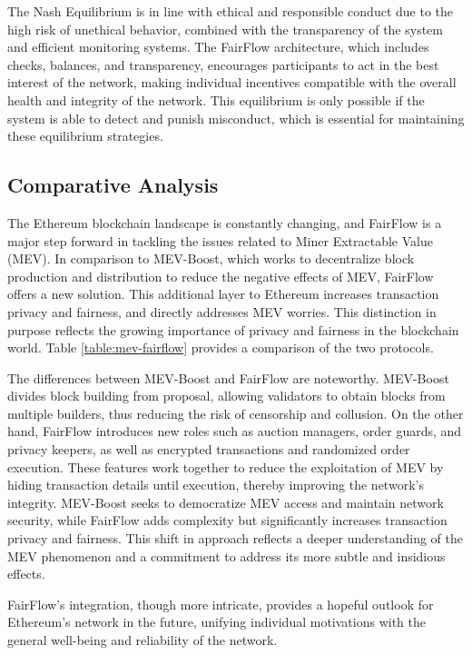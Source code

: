 \documentclass{article}
\begin{document}
The Nash Equilibrium is in line with ethical and responsible conduct due to the high risk of unethical behavior, combined with the transparency of the system and efficient monitoring systems. The FairFlow architecture, which includes checks, balances, and transparency, encourages participants to act in the best interest of the network, making individual incentives compatible with the overall health and integrity of the network. This equilibrium is only possible if the system is able to detect and punish misconduct, which is essential for maintaining these equilibrium strategies.

\subsection{Comparative Analysis}

The Ethereum blockchain landscape is constantly changing, and FairFlow is a major step forward in tackling the issues related to Miner Extractable Value (MEV). In comparison to MEV-Boost, which works to decentralize block production and distribution to reduce the negative effects of MEV, FairFlow offers a new solution. This additional layer to Ethereum increases transaction privacy and fairness, and directly addresses MEV worries. This distinction in purpose reflects the growing importance of privacy and fairness in the blockchain world. Table \ref{table:mev-fairflow} provides a comparison of the two protocols.

The differences between MEV-Boost and FairFlow are noteworthy. MEV-Boost divides block building from proposal, allowing validators to obtain blocks from multiple builders, thus reducing the risk of censorship and collusion. On the other hand, FairFlow introduces new roles such as auction managers, order guards, and privacy keepers, as well as encrypted transactions and randomized order execution. These features work together to reduce the exploitation of MEV by hiding transaction details until execution, thereby improving the network's integrity. MEV-Boost seeks to democratize MEV access and maintain network security, while FairFlow adds complexity but significantly increases transaction privacy and fairness. This shift in approach reflects a deeper understanding of the MEV phenomenon and a commitment to address its more subtle and insidious effects.

FairFlow's integration, though more intricate, provides a hopeful outlook for Ethereum's network in the future, unifying individual motivations with the general well-being and reliability of the network.
\end{document}
